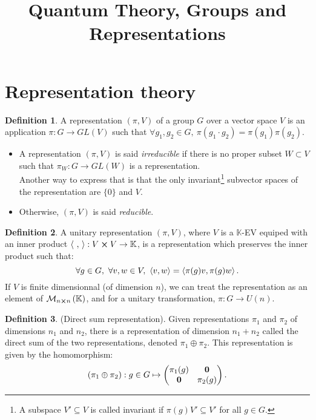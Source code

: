 \documentclass[11pt,a4paper]{article}
\title{Quantum Theory, Groups and Representations}
\theoremstyle{definition}
\newtheorem{definition}{Definition}[section]
\numberwithin{equation}{section}
\begin{document}
\maketitle
\section{Representation theory}
\begin{definition}
    A representation $\left(\pi,V\right)$ of a group $G$ over a vector space $V$ is an application $\pi:G\rightarrow GL(V)$ such that $\forall g_1,g_2 \in G, \ \pi\left(g_1\cdot g_2\right) = \pi\left(g_1\right) \pi(g_2)$.
    \begin{itemize}
        \item A representation $(\pi,V)$ is said \textit{irreducible} if there is no proper subset $W \subset  V$ such that $\pi_W:G\rightarrow GL(W)$ is a representation.\\
         Another way to express that is that the only invariant\footnote{A subspace $V'\subseteq V $ is called invariant if $\pi(g)V' \subseteq V'$ for all $g \in G$.} subvector spaces of the representation are $\{0\}$ and $V$.
        \item Otherwise, $(\pi,V)$ is said \textit{reducible}.
    \end{itemize}
\end{definition}
\begin{definition}
    A unitary representation $(\pi,V)$, where $V$ is a $\mathbb{K}$-EV equiped with an inner product $\expval{\ ,\ }:V\cross V \rightarrow \mathbb{K}$, is a representation which preserves the inner product such that:
    \begin{equation*}
        \forall g \in G,\ \forall v,w \in V,\ \expval{v,w} = \expval{\pi(g)v, \pi(g)w}. 
    \end{equation*}
    If $V$ is finite dimensionnal (of dimension $n$), we can treat the representation as an element of $\mathcal{M}_{n \cross n}\left(\mathbb{K}\right)$, and for a unitary transformation, $\pi : G \rightarrow U(n)$.
\end{definition}
\begin{definition}
    (Direct sum representation). Given representations $\pi_1$ and $\pi_2$ of dimensions $n_1$ and $n_2$, there is a representation of dimension $n_1+n_2$ called the direct sum of the two representations, denoted $\pi_1 \oplus \pi_2$. This representation is given by the homomorphism:
    \begin{equation*}
        \left(\pi_1 \oplus \pi_2\right):g \in G \mapsto \begin{pmatrix}
            \pi_1(g)& \vb{0}\\
            \vb{0}& \pi_2(g)
        \end{pmatrix}.
    \end{equation*}
\end{definition}
\end{document}
